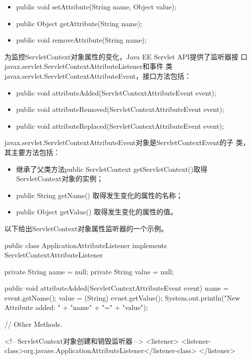 \begin{itemize}
\item public void setAttribute(String name, Object value);
\item public Object getAttribute(String name);
\item public void removeAttribute(String name);
\end{itemize}

为监控ServletContext对象属性的变化，Java EE Servlet API提供了监听器接
口javax.servlet.ServletContextAttributeListener和事件
类javax.servlet.ServletContextAttributeEvent，接口方法包括：

\begin{itemize}\small
\item public void attributeAdded(ServletContextAttributeEvent event);
\item public void attributeRemoved(ServletContextAttributeEvent event);
\item public void attributeReplaced(ServletContextAttributeEvent event);
\end{itemize}


javax.servlet.ServletContextAttributeEvent对象是ServletContextEvent的子
类，其主要方法包括：

\begin{itemize}
\item 继承了父类方法public ServletContext getServletContext()取得
  ServletContext对象的实例；
\item public String getName() 取得发生变化的属性的名称；
\item public Object getValue() 取得发生变化的属性的值。
\end{itemize}

以下给出ServletContext对象属性监听器的一个示例。


\begin{javaCode}
  public class ApplicationAttributeListener implements
  ServletContextAttributeListener {
    private String name = null;
    private String value = null;
    
    public void attributeAdded(ServletContextAttributeEvent event) {
      name = event.getName();
      value = (String) evnet.getValue();
      System.out.println("New Attribute added: " + "name" + "=" + "value");
    }

    // Other Methods.

  }
\end{javaCode}


\begin{xmlCode}
  <!-- ServletContext对象创建和销毁监听器 -->
  <listener>
    <listener-class>org.javaee.ApplicationAttributeListener</listener-class>
  </listener> 
\end{xmlCode}
